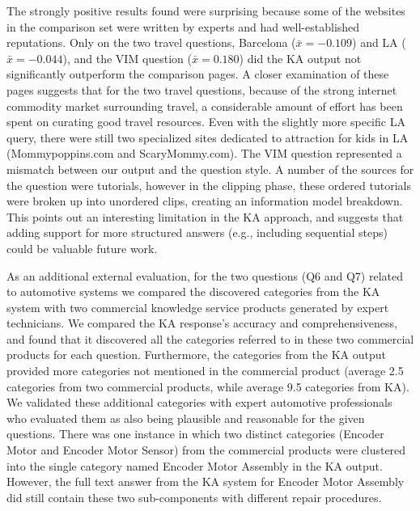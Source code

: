 The strongly positive results found were surprising because some of the websites in the comparison set were written by experts and had well-established reputations. Only on the two travel questions, Barcelona ($\bar{x} = -0.109$) and LA ($\bar{x} = -0.044$), and the VIM question ($\bar{x} = 0.180$) did the KA output not significantly outperform the comparison pages. A closer examination of these pages suggests that for the two travel questions, because of the strong internet commodity market surrounding travel, a considerable amount of effort has been spent on curating good travel resources. Even with the slightly more specific LA query, there were still two specialized sites dedicated to attraction for kids in LA (Mommypoppins.com and ScaryMommy.com). The VIM question represented a mismatch between our output and the question style. A number of the sources for the question were tutorials, however in the clipping phase, these ordered tutorials were broken up into unordered clips, creating an information model breakdown. This points out an interesting limitation in the KA approach, and suggests that adding support for more structured answers (e.g., including sequential steps) could be valuable future work. 


As an additional external evaluation, for the two questions (Q6 and Q7) related to automotive systems we compared the discovered categories from the KA system with two commercial knowledge service products generated by expert technicians. We compared the KA response's accuracy and comprehensiveness, and found that it discovered all the categories referred to in these two commercial products for each question. Furthermore, the categories from the KA output provided more categories not mentioned in the commercial product (average 2.5 categories from two commercial products, while average 9.5 categories from KA). We validated these additional categories with expert automotive professionals who evaluated them as also being plausible and reasonable for the given questions. There was one instance in which two distinct categories (Encoder Motor and Encoder Motor Sensor) from the commercial products were clustered into the single category named Encoder Motor Assembly in the KA output. However, the full text answer from the KA system for Encoder Motor Assembly did still contain these two sub-components with different repair procedures. 

